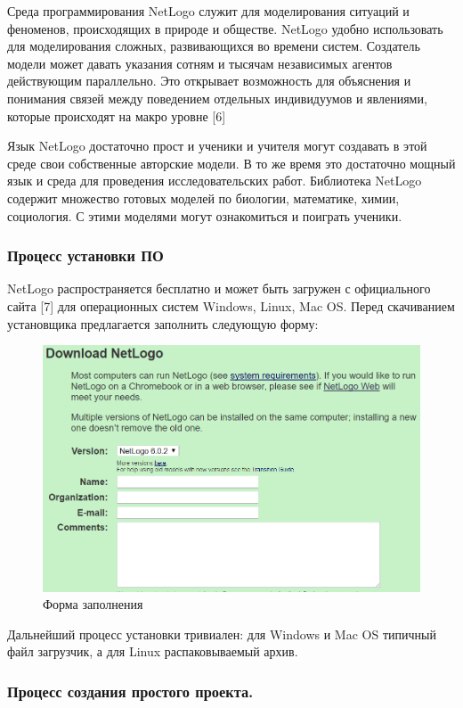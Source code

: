 \documentclass[14pt,a4paper,report]{report}
\begin{document}
Среда программирования NetLogo служит для моделирования ситуаций и феноменов, происходящих в природе и обществе. NetLogo удобно использовать для моделирования сложных, развивающихся во времени систем. Создатель модели может давать указания сотням и тысячам независимых агентов действующим параллельно. Это открывает возможность для объяснения и понимания связей между поведением отдельных индивидуумов и явлениями, которые происходят на макро уровне [6]

Язык NetLogo достаточно прост и ученики и учителя могут создавать в этой среде свои собственные авторские модели. В то же время это достаточно мощный язык и среда для проведения исследовательских работ. Библиотека NetLogo содержит множество готовых моделей по биологии, математике, химии, социология. С этими моделями могут ознакомиться и поиграть ученики.

\subsubsection{Процесс установки ПО}

NetLogo распространяется бесплатно и может быть загружен с официального сайта [7] для операционных систем Windows, Linux, Mac OS. Перед скачиванием установщика предлагается заполнить следующую форму:

\begin{figure}[h!]
	\centering
	\includegraphics[scale = 0.33]{images/0_3.png}
	\caption{Форма заполнения}
\end{figure}

Дальнейший процесс установки тривиален: для Windows и Mac OS типичный файл загрузчик, а для Linux распаковываемый архив.

\subsubsection{Процесс создания простого проекта.}
\end{document}
